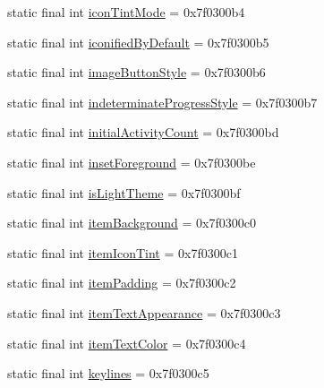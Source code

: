 \begin{DoxyCompactItemize}
\item 
static final int \mbox{\hyperlink{classandroid_1_1support_1_1design_1_1_r_1_1attr_a2b4ab026128c61cab1373dce1713a691}{icon\+Tint\+Mode}} = 0x7f0300b4
\item 
static final int \mbox{\hyperlink{classandroid_1_1support_1_1design_1_1_r_1_1attr_af56e63f7366c9cd5ce1c639e20df1369}{iconified\+By\+Default}} = 0x7f0300b5
\item 
static final int \mbox{\hyperlink{classandroid_1_1support_1_1design_1_1_r_1_1attr_af7235a5110e0fe6517ca8e216ef5f42f}{image\+Button\+Style}} = 0x7f0300b6
\item 
static final int \mbox{\hyperlink{classandroid_1_1support_1_1design_1_1_r_1_1attr_acf61552a40e127dc18fd4fb54c1eab8c}{indeterminate\+Progress\+Style}} = 0x7f0300b7
\item 
static final int \mbox{\hyperlink{classandroid_1_1support_1_1design_1_1_r_1_1attr_ac1527e93f4ac647fe8b997a212e62754}{initial\+Activity\+Count}} = 0x7f0300bd
\item 
static final int \mbox{\hyperlink{classandroid_1_1support_1_1design_1_1_r_1_1attr_a54280b38c1851ec6e215016b464d32c2}{inset\+Foreground}} = 0x7f0300be
\item 
static final int \mbox{\hyperlink{classandroid_1_1support_1_1design_1_1_r_1_1attr_a1f68ce8ebcae8b5f8d8580fbffaabd82}{is\+Light\+Theme}} = 0x7f0300bf
\item 
static final int \mbox{\hyperlink{classandroid_1_1support_1_1design_1_1_r_1_1attr_ae48a0f7e4946ee6f29e8bef7569b26c5}{item\+Background}} = 0x7f0300c0
\item 
static final int \mbox{\hyperlink{classandroid_1_1support_1_1design_1_1_r_1_1attr_ac3ebcf6eecb614d608d84da08f843033}{item\+Icon\+Tint}} = 0x7f0300c1
\item 
static final int \mbox{\hyperlink{classandroid_1_1support_1_1design_1_1_r_1_1attr_a55b67df173feee6290403260d8aace52}{item\+Padding}} = 0x7f0300c2
\item 
static final int \mbox{\hyperlink{classandroid_1_1support_1_1design_1_1_r_1_1attr_a13c260aff50840e5391823f34b646f84}{item\+Text\+Appearance}} = 0x7f0300c3
\item 
static final int \mbox{\hyperlink{classandroid_1_1support_1_1design_1_1_r_1_1attr_a61dc304c9c0451453edf1b7c36f6e2fe}{item\+Text\+Color}} = 0x7f0300c4
\item 
static final int \mbox{\hyperlink{classandroid_1_1support_1_1design_1_1_r_1_1attr_ab89509da9ca94f7827610e2ef509f3c4}{keylines}} = 0x7f0300c5
\item 

\end{DoxyCompactItemize}
